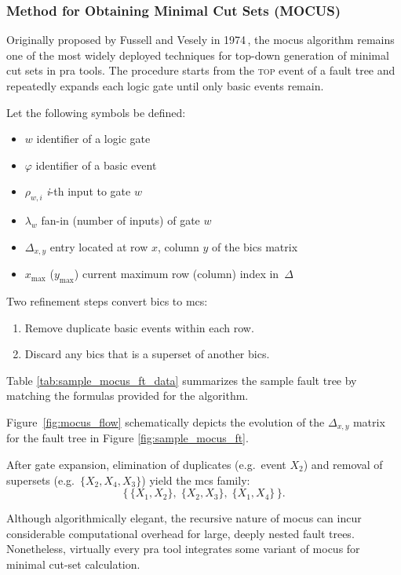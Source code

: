 \subsubsection{Method for Obtaining Minimal Cut Sets (MOCUS)}

Originally proposed by Fussell and Vesely in 1974\,\cite{Fussell1974MOCUS}, the \acrshort{mocus} algorithm remains one of the most widely deployed techniques for top-down generation of minimal cut sets in \acrshort{pra} tools. The procedure starts from the \textsc{top} event of a fault tree and repeatedly expands each logic gate until only basic events remain.

Let the following symbols be defined:
\begin{itemize}
  \item $w$ identifier of a logic gate
  \item $\varphi$ identifier of a basic event
  \item $\rho_{w,i}$ \emph{i}-th input to gate $w$
  \item $\lambda_{w}$ fan-in (number of inputs) of gate $w$
  \item $\Delta_{x,y}$ entry located at row $x$, column $y$ of the \acrfull{bics} matrix
  \item $x_{\max}$ ($y_{\max}$) current maximum row (column) index in~$\Delta$
\end{itemize}



Two refinement steps convert \acrshort{bics} to \acrshort{mcs}:
\begin{enumerate}
  \item Remove duplicate basic events within each row.
  \item Discard any \acrshort{bics} that is a superset of another \acrshort{bics}.
\end{enumerate}

% 

% 

Table \ref{tab:sample_mocus_ft_data} summarizes the sample fault tree by matching the formulas provided for the algorithm.



Figure~\ref{fig:mocus_flow} schematically depicts the evolution of the $\Delta_{x,y}$ matrix for the fault tree in Figure \ref{fig:sample_mocus_ft}. 

After gate expansion, elimination of duplicates (e.g.\ event $X_2$) and removal of supersets (e.g.\ $\{X_2,X_4,X_3\}$) yield the \acrshort{mcs} family:
\[
  \bigl\{\,\{X_1,X_2\},\; \{X_2,X_3\},\; \{X_1,X_4\}\,\bigr\}.
\]



Although algorithmically elegant, the recursive nature of \acrshort{mocus} can incur considerable computational overhead for large, deeply nested fault trees.  Nonetheless, virtually every \acrshort{pra} tool integrates some variant of \acrshort{mocus} for minimal cut-set calculation.
